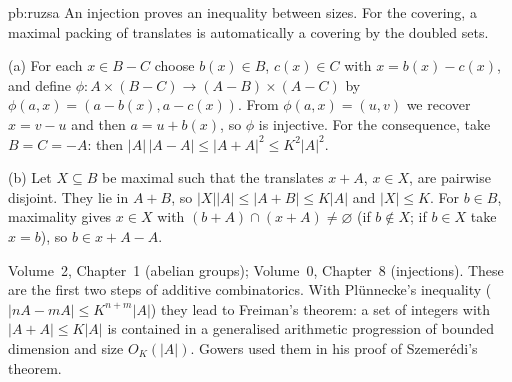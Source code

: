 \begin{solution}{pb:ruzsa}
\idea An injection proves an inequality between sizes. For the covering, a maximal packing of translates is automatically a
covering by the doubled sets.

\writeup (a) For each $x\in B-C$ choose $b(x)\in B$, $c(x)\in C$ with $x=b(x)-c(x)$, and define $\phi:A\times(B-C)\to(A-B)\times(A-C)$ by
$\phi(a,x)=(a-b(x),a-c(x))$. From $\phi(a,x)=(u,v)$ we recover $x=v-u$ and then $a=u+b(x)$, so $\phi$ is injective. For the consequence, take
$B=C=-A$: then $|A|\,|A-A|\le|A+A|^2\le K^2|A|^2$.

(b) Let $X\subseteq B$ be maximal such that the translates $x+A$, $x\in X$, are pairwise disjoint. They lie in $A+B$, so $|X||A|\le|A+B|\le K|A|$ and
$|X|\le K$. For $b\in B$, maximality gives $x\in X$ with $(b+A)\cap(x+A)\ne\varnothing$ (if $b\notin X$; if $b\in X$ take $x=b$), so $b\in x+A-A$.

\tools Volume~2, Chapter~1 (abelian groups); Volume~0, Chapter~8 (injections).
\leads These are the first two steps of additive combinatorics. With Plünnecke's inequality ($|nA-mA|\le K^{n+m}|A|$) they lead to
Freiman's theorem: a set of integers with $|A+A|\le K|A|$ is contained in a generalised arithmetic progression of bounded dimension and
size $O_K(|A|)$. Gowers used them in his proof of Szemerédi's theorem.
\end{solution}

